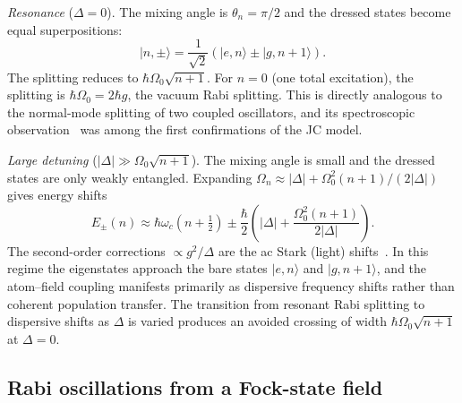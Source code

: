 \documentclass[12pt]{iopart}
\begin{document}
\textit{Resonance} ($\Delta = 0$). The mixing angle is $\theta_n = \pi/2$ and the dressed states become equal superpositions:
\begin{equation}
|n, \pm\rangle = \frac{1}{\sqrt{2}}\left(|e,n\rangle \pm |g,n{+}1\rangle\right).
\end{equation}
The splitting reduces to $\hbar\Omega_0\sqrt{n+1}$. For $n = 0$ (one total excitation), the splitting is $\hbar\Omega_0 = 2\hbar g$, the vacuum Rabi splitting. This is directly analogous to the normal-mode splitting of two coupled oscillators, and its spectroscopic observation~\cite{thompson1992} was among the first confirmations of the JC model.

\textit{Large detuning} ($|\Delta| \gg \Omega_0\sqrt{n+1}$). The mixing angle is small and the dressed states are only weakly entangled. Expanding $\Omega_n \approx |\Delta| + \Omega_0^2(n+1)/(2|\Delta|)$ gives energy shifts
\begin{equation}
E_\pm(n) \approx \hbar\omega_c\left(n + \tfrac{1}{2}\right) \pm \frac{\hbar}{2}\left(|\Delta| + \frac{\Omega_0^2(n+1)}{2|\Delta|}\right).
\end{equation}
The second-order corrections $\propto g^2/\Delta$ are the ac Stark (light) shifts~\cite{haroche2006}. In this regime the eigenstates approach the bare states $|e,n\rangle$ and $|g,n{+}1\rangle$, and the atom--field coupling manifests primarily as dispersive frequency shifts rather than coherent population transfer. The transition from resonant Rabi splitting to dispersive shifts as $\Delta$ is varied produces an avoided crossing of width $\hbar\Omega_0\sqrt{n+1}$ at $\Delta = 0$.


\subsection{Rabi oscillations from a Fock-state field}
\label{sec:rabi_fock}
\end{document}
